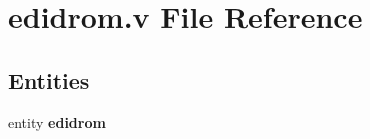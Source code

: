 \section{edidrom.\-v File Reference}
\label{edidrom_8v}
\subsection*{Entities}
\begin{DoxyCompactItemize}
\item 
entity {\bf edidrom}
\end{DoxyCompactItemize}
